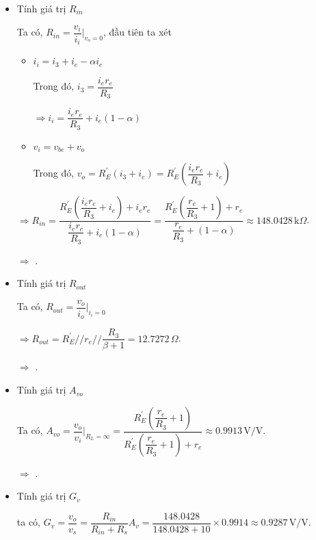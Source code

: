 \begin{itemize}[label=-]
	\item Tính giá trị $R_{in}$
	
	Ta có, $R_{in} = \dfrac{v_{i}}{i_{i}}|_{v_{o} = 0}$, đầu tiên ta xét
	
	\begin{itemize}[label=+, leftmargin=1cm]
		\item $i_{i} = i_{3} + i_{e} - \alpha i_{e} $
		
		Trong đó, $i_{3} = \dfrac{i_{e} r_{e}}{R_{3}}$
		
		$\Rightarrow i_{i} = \dfrac{i_{e} r_{e}}{R_{3}} + i_{e}(1-\alpha)$
		\item $v_{i} = v_{be} + v_{o}$
		
		Trong đó, $v_{o} = R_{E}^{'} (i_{3} + i_{e}) = R_{E}^{'} \left( \dfrac{i_{e} r_{e}}{R_{3}} + i_{e} \right)$
	\end{itemize}
	
	$\Rightarrow R_{in} = \dfrac{R_{E}^{'} \left( \dfrac{i_{e} r_{e}}{R_{3}} + i_{e} \right) + i_{e}r_{e}}{\dfrac{i_{e} r_{e}}{R_{3}} + i_{e}(1-\alpha)} = \dfrac{R_{E}^{'} \left( \dfrac{r_{e}}{R_{3}} + 1 \right) + r_{e}}{\dfrac{r_{e}}{R_{3}} + (1-\alpha)} \approx 148.0428 \,\text{k}\Omega$.
	
	$\Rightarrow$ .
	
	\item Tính giá trị $R_{out}$
	
	Ta có, $R_{out} = \dfrac{v_{o}}{i_{o}}|_{i_{i} = 0}$
	
	$\Rightarrow R_{out} = R_{E}^{'} // r_{e} // \dfrac{R_{3}}{\beta + 1} = 12.7272\,\Omega$.
	
	$\Rightarrow$ .
	
	\item Tính giá trị $A_{vo}$
	
	Ta có, $A_{vo} = \dfrac{v_{o}}{v_{i}}|_{R_{L} = \infty} = \dfrac{R_{E}^{'} \left( \dfrac{r_{e}}{R_{3}} + 1 \right)}{R_{E}^{'} \left( \dfrac{r_{e}}{R_{3}} + 1 \right) + r_{e}} \approx 0.9913 \,\text{V/V}$.
	
	$\Rightarrow$ .
	
	\item Tính giá trị $G_{v}$
	
	ta có, $G_{v} = \dfrac{v_{o}}{v_{s}} = \dfrac{R_{in}}{R_{in} + R_{s}} A_{v} = \dfrac{148.0428}{148.0428 + 10}\times 0.9914 \approx 0.9287 \,\text{V/V}$.
	

\end{itemize}
